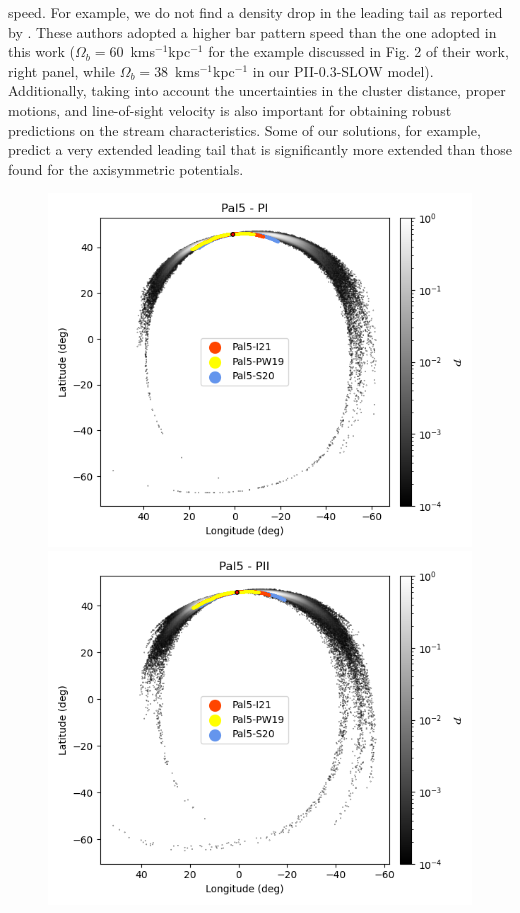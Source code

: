 speed. For example, we do not find a density drop in the leading tail as reported by  \citet{2017NatAs...1..633P}. These authors adopted a higher bar pattern speed than the one adopted in this work ($\Omega_b=60$~kms$^{-1}$kpc$^{-1}$ for the example discussed in Fig. 2 of their work, right panel, while $\Omega_b=38$~kms$^{-1}$kpc$^{-1}$ in our PII-0.3-SLOW model). Additionally, taking into account the uncertainties in the cluster distance, proper motions, and line-of-sight velocity is also important for obtaining robust predictions on the stream characteristics. Some of our solutions, for example, predict a very extended leading tail that is significantly more extended than those found for the axisymmetric potentials.

            \twocolumn
            \begin{figure}[h!]
                \begin{center}
                    \includegraphics[clip=true, trim = 0mm 0mm 0mm 0mm, width=0.65\columnwidth]{images/PI_individual_Pal5_galstream-Pal5-l-b.png}
                    \includegraphics[clip=true, trim = 0mm 0mm 0mm 0mm, width=0.65\columnwidth]{images/PII_individual_Pal5_galstream-Pal5-l-b.png}

\end{center}
\end{figure}
